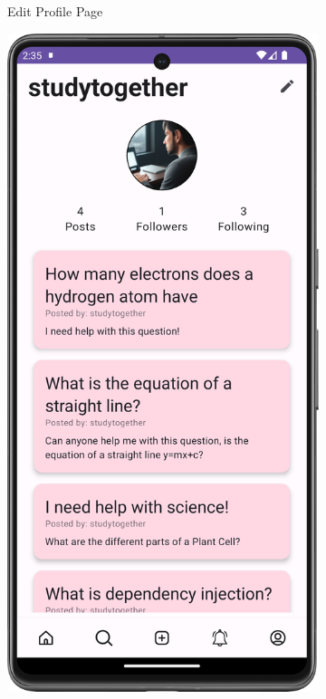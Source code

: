 \begin{figure}[H]
\begin{subfigure}[b]{0.3\textwidth}
    \caption{Edit Profile Page}
    \label{fig:edit_profile}
  \end{subfigure}
  \hfill
  \begin{subfigure}[b]{0.3\textwidth}
    \includegraphics[width=\textwidth]{Figures/Product_Images/Auth/profile.png}

\end{subfigure}
\end{figure}
